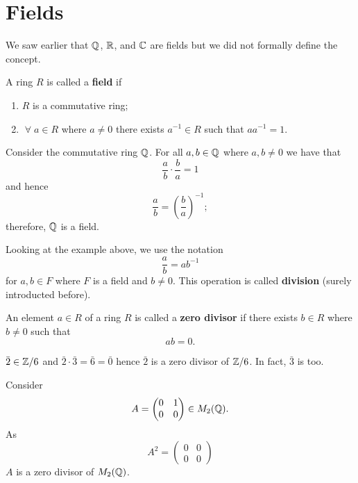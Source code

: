 \section{Fields}

We saw earlier that $\mathbb{Q}$, $\mathbb{R}$, and $\mathbb{C}$ are fields but we did not formally define the concept.

\begin{definition}[Field] 
    A ring $R$ is called a \textbf{field} if
    \begin{enumerate}
        \item $R$ is a commutative ring;
        \item $\;\forall\; a \in R$ where $a \neq 0$ there exists $a^{-1} \in R$ such that $aa^{-1} = 1$.
    \end{enumerate}
\end{definition}

\begin{example}
    Consider the commutative ring $\mathbb{Q}$. For all $a, b \in \mathbb{Q}$ where $a, b \neq 0$ we have that
    \[ \frac ab \cdot \frac ba = 1 \] 
    and hence
    \[ \frac ab = \left(\frac ba\right)^{-1}; \]
    therefore, $\mathbb{Q}$ is a field.
\end{example}

Looking at the example above, we use the notation 
\[ \frac ab = ab^{-1} \] for $a, b \in F$ where $F$ is a field and $b \neq 0$. This operation is called \textbf{division} (surely introducted before).

\begin{definition}
    An element $a \in R$ of a ring $R$ is called a \textbf{zero divisor} if there exists $b \in R$ where $b \neq 0$ such that 
    \[ ab = 0. \]
\end{definition}

\begin{example}
    $\bar 2 \in \mathbb{Z}/6$ and $\bar 2 \cdot \bar 3 = \bar 6 = \bar 0$ hence $\bar 2$ is a zero divisor of $\mathbb{Z} / 6$. In fact, $\bar 3$ is too.
\end{example}

\begin{example}
    Consider
    \[ A = \begin{pmatrix} 0 & 1 \\ 0 & 0 \end{pmatrix} \in M_2(\mathbb{Q}). \]
    As
    \[ A^2 = \begin{pmatrix} 0 & 0 \\ 0 & 0 \end{pmatrix} \] 
    $A$ is a zero divisor of $M_2(\mathbb{Q})$.
\end{example}

